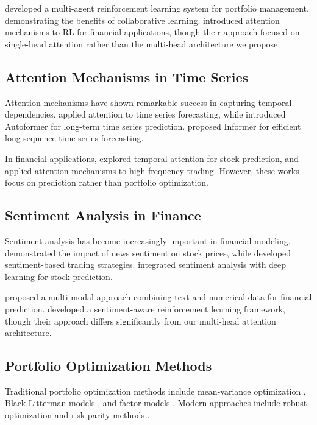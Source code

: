 \documentclass[11pt,twocolumn]{article}
\theoremstyle{definition}
\begin{document}
\citet{chen2021deep} developed a multi-agent reinforcement learning system for portfolio management, demonstrating the benefits of collaborative learning. \citet{wang2020deep} introduced attention mechanisms to RL for financial applications, though their approach focused on single-head attention rather than the multi-head architecture we propose.

\subsection{Attention Mechanisms in Time Series}

Attention mechanisms have shown remarkable success in capturing temporal dependencies. \citet{li2019enhancing} applied attention to time series forecasting, while \citet{wu2021autoformer} introduced Autoformer for long-term time series prediction. \citet{zhou2021informer} proposed Informer for efficient long-sequence time series forecasting.

In financial applications, \citet{liu2021temporal} explored temporal attention for stock prediction, and \citet{zhang2021attention} applied attention mechanisms to high-frequency trading. However, these works focus on prediction rather than portfolio optimization.

\subsection{Sentiment Analysis in Finance}

Sentiment analysis has become increasingly important in financial modeling. \citet{li2014news} demonstrated the impact of news sentiment on stock prices, while \citet{chen2014sentiment} developed sentiment-based trading strategies. \citet{liu2020sentiment} integrated sentiment analysis with deep learning for stock prediction.

\citet{zhang2020sentiment} proposed a multi-modal approach combining text and numerical data for financial prediction. \citet{wang2021sentiment} developed a sentiment-aware reinforcement learning framework, though their approach differs significantly from our multi-head attention architecture.

\subsection{Portfolio Optimization Methods}

Traditional portfolio optimization methods include mean-variance optimization \citep{markowitz1952portfolio}, Black-Litterman models \citep{black1992global}, and factor models \citep{fama1993common}. Modern approaches include robust optimization \citep{ben2009robust} and risk parity methods \citep{qian2005risk}.
\end{document}
